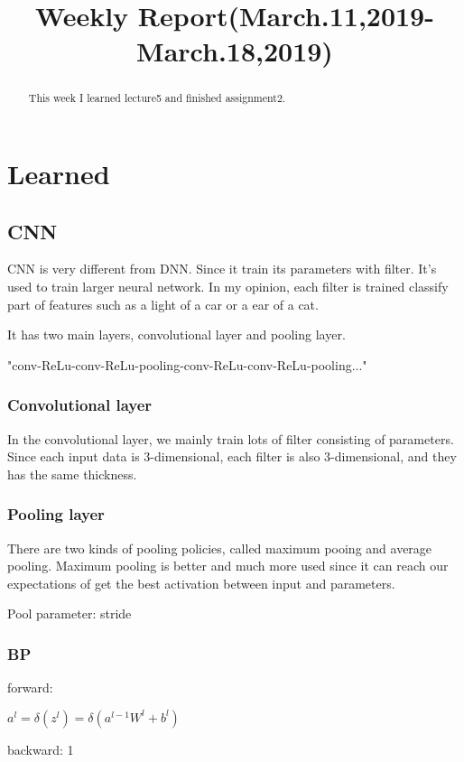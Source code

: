 \documentclass{article}
\title{Weekly Report(March.11,2019-March.18,2019)}
\begin{document}
\maketitle
\begin{abstract}
	This week I learned lecture5 and finished assignment2.
\end{abstract}

\section{Learned}
\subsection{CNN}
CNN is very different from DNN. Since it train its parameters with filter. It's used to train larger neural network. In my opinion, each filter is trained classify part of features such as a light of a car or a ear of a cat.

It has two main layers, convolutional layer and pooling layer.

\begin{center}
	"conv-ReLu-conv-ReLu-pooling-conv-ReLu-conv-ReLu-pooling..."
\end{center}

\subsubsection{Convolutional layer}
In the convolutional layer, we mainly train lots of filter consisting of parameters. Since each input data is 3-dimensional, each filter is also 3-dimensional, and they has the same thickness.

\subsubsection{Pooling layer}
There are two kinds of pooling policies, called maximum pooing and average pooling. Maximum pooling is better and much more used since it can reach our expectations of get the best activation between input and parameters. 

Pool parameter: stride
\subsubsection{BP}
forward: 
\begin{center}
	${\displaystyle a^l = \delta(z^l) = \delta(a^{l-1}W^l+b^l)}$
\end{center}
backward:
1
\end{document}
